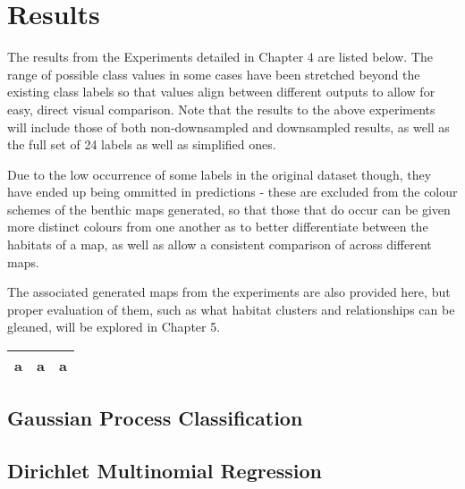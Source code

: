 \chapter{Results} \label{chap:results}

The results from the Experiments detailed in Chapter 4 are listed below. The range of possible class values in some cases have been stretched beyond the existing class labels so that values align between different outputs to allow for easy, direct visual comparison. Note that the results to the above experiments will include those of both non-downsampled and downsampled results, as well as the full set of 24 labels as well as simplified ones.

Due to the low occurrence of some labels in the original dataset though, they have ended up being ommitted in predictions - these are excluded from the colour schemes of the benthic maps generated, so that those that do occur can be given more distinct colours from one another as to better differentiate between the habitats of a map, as well as allow a consistent comparison of across different maps.

The associated generated maps from the experiments are also provided here, but proper evaluation of them, such as what habitat clusters and relationships can be gleaned, will be explored in Chapter 5. 

\begin{tabular}{|c|c|c|}
    \hline
    a & a & a \\
    \hline
\end{tabular}

\section{Gaussian Process Classification}


\section{Dirichlet Multinomial Regression}



